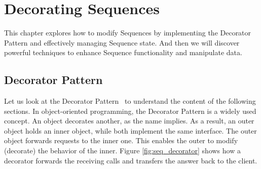 \section{Decorating Sequences}
\label{sec:Decorating Sequences}
This chapter explores how to modify Sequences by implementing the Decorator 
Pattern and effectively managing Sequence state. And then we will discover 
powerful techniques to enhance Sequence functionality and manipulate data.

\subsection{Decorator Pattern}
\label{sub:Decorator Pattern}
Let us look at the Decorator Pattern~\cite[p.~226]{gang_of_four_depa} to understand the content of the 
following sections. In object-oriented programming, the Decorator Pattern is a 
widely used concept. An object decorates another, as the name implies. As a 
result, an outer object holds an inner object, while both implement the same 
interface. The outer object forwards requests to the inner one. This enables
the outer to modify (decorate) the behavior of the inner. 
Figure \ref{fig:seq_decorator} shows how a decorator forwards the receiving calls and 
transfers the answer back to the client.

